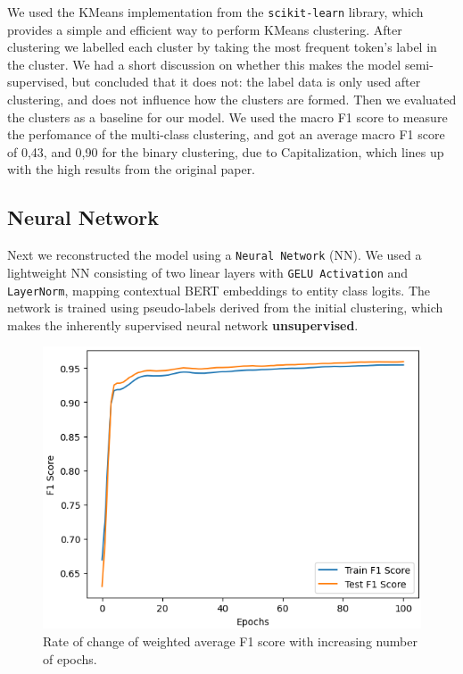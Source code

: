 \documentclass[11pt]{article}
\begin{document}
We used the KMeans implementation from the \texttt{scikit-learn} library, which provides a simple and efficient way to perform KMeans clustering.
After clustering we labelled each cluster by taking the most frequent token's label in the cluster. We had a short discussion on whether 
this makes the model semi-supervised, but concluded that it does not: the label data is only used after clustering, and does not influence
how the clusters are formed. Then we evaluated the clusters as a baseline for our model. We used the macro F1 score to measure the perfomance of
the multi-class clustering, and got an average macro F1 score of 0,43, and 0,90 for the binary clustering, due to Capitalization, which
lines up with the high results from the original paper.

\subsection{Neural Network}

Next we reconstructed the model using a \texttt{Neural Network} (NN). We used a lightweight NN consisting of two linear layers with
\texttt{GELU Activation} and \texttt{LayerNorm}, mapping contextual BERT embeddings to entity class logits. The network is trained using
pseudo-labels derived from the initial clustering, which makes the inherently supervised neural network \textbf{unsupervised}.

\begin{figure}[H]
  \includegraphics[width=\columnwidth]{F1-Epochs.png}
  \caption{Rate of change of weighted average F1 score with increasing number of epochs.}
  \label{fig:F1-Epochs}
\end{figure}
\end{document}
